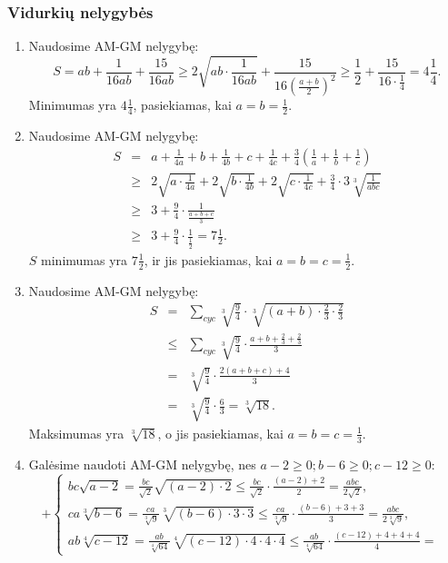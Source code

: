 \subsubsection*{Vidurkių nelygybės}
\begin{enumerate} 
\item 
Naudosime AM-GM nelygybę:
$$S=ab+\frac{1}{16ab}+\frac{15}{16ab}\geq2\sqrt{ab\cdot\frac{1}{16ab}}+\frac{15}{16\left(\frac{a+b}{2}\right)^2}
\geq\frac{1}{2}+\frac{15}{16\cdot\frac{1}{4}}=4\frac{1}{4}.$$
Minimumas yra $4\frac{1}{4}$, pasiekiamas, kai $a=b=\frac{1}{2}$.
\item 
Naudosime AM-GM nelygybę: \begin{eqnarray*}
S&=&a+\frac{1}{4a}+b+\frac{1}{4b}+c+\frac{1}{4c}+\frac{3}{4}\left(\frac{1}{a}+\frac{1}{b}+\frac{1}{c}\right)\\
&\geq&2\sqrt{a\cdot\frac{1}{4a}}+2\sqrt{b\cdot\frac{1}{4b}}+
2\sqrt{c\cdot\frac{1}{4c}}+ \frac{3}{4}\cdot3\sqrt[3]{\frac{1}{abc}}\\
&\geq&3+\frac{9}{4}\cdot\frac{1}{\frac{a+b+c}{3}}\\
&\geq&3+\frac{9}{4}\cdot\frac{1}{\frac{1}{2}}=7\frac{1}{2}.
\end{eqnarray*} $S$ minimumas yra $7\frac{1}{2}$, ir jis pasiekiamas,
kai $a=b=c=\frac{1}{2}$.
\item 
Naudosime AM-GM nelygybę: \begin{eqnarray*}
S&=&\sum_{cyc}{\sqrt[3]{\frac{9}{4}}\cdot\sqrt[3]{(a+b)\cdot\frac{2}{3}\cdot\frac{2}{3}}}\\
&\leq&\sum_{cyc}{\sqrt[3]{\frac{9}{4}}\cdot\frac{a+b+\frac{2}{3}+\frac{2}{3}}{3}}\\
&=&\sqrt[3]{\frac{9}{4}}\cdot\frac{2(a+b+c)+4}{3}\\
&=&\sqrt[3]{\frac{9}{4}}\cdot\frac{6}{3}=\sqrt[3]{18}.\end{eqnarray*}
Maksimumas yra $\sqrt[3]{18}$, o jis pasiekiamas, kai
$a=b=c=\frac{1}{3}$.
\item 
Galėsime naudoti AM-GM nelygybę, nes $a-2\geq0; b-6\geq0; c-12\geq0$:
$$+\left\{ \begin{array}{ll}
bc\sqrt{a-2}=\frac{bc}{\sqrt{2}}\sqrt{(a-2)\cdot2}\leq\frac{bc}{\sqrt{2}}\cdot\frac{(a-2)+2}{2}=
\frac{abc}{2\sqrt{2}}, & \\ ca\sqrt[3]{b-6}=
\frac{ca}{\sqrt[3]{9}}\sqrt[3]{(b-6)\cdot3\cdot3}\leq\frac{ca}{\sqrt[3]{9}}\cdot\frac{(b-6)+3+3}{3}=
\frac{abc}{2\sqrt[3]{9}},&\\ ab\sqrt[4]{c-12}=
\frac{ab}{\sqrt[4]{64}}\sqrt[4]{(c-12)\cdot4\cdot4\cdot4}\leq\frac{ab}{\sqrt[4]{64}}\cdot\frac{(c-12)+4+4+4}{4}=

\end{array}$$
\end{enumerate}

